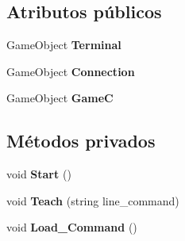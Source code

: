 \subsection*{Atributos públicos}
\begin{DoxyCompactItemize}
\item 
\mbox{\label{class_controller_a51323d3c4ec14f6cb08c5ff78f043294}} 
Game\+Object {\bfseries Terminal}
\item 
\mbox{\label{class_controller_af40ddeff071064e6f098552df3cfd34e}} 
Game\+Object {\bfseries Connection}
\item 
\mbox{\label{class_controller_a1eb5e590212ea6268156999f313bf76c}} 
Game\+Object {\bfseries GameC}
\end{DoxyCompactItemize}
\subsection*{Métodos privados}
\begin{DoxyCompactItemize}
\item 
\mbox{\label{class_controller_afb3af298c368aea3203c2c0401f92eb5}} 
void {\bfseries Start} ()
\item 
\mbox{\label{class_controller_a5451887045a5b5daedd6fb1d0c9c90ae}} 
void {\bfseries Teach} (string line\+\_\+command)
\item 
\mbox{\label{class_controller_abafc0ba1c023556d28a3034dca656d21}} 
void {\bfseries Load\+\_\+\+Command} ()
\end{DoxyCompactItemize}
